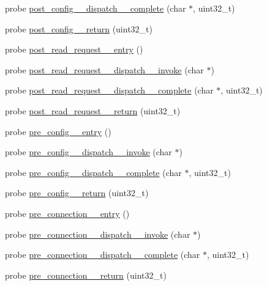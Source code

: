 \begin{DoxyCompactItemize}
\item 
probe \hyperlink{apache__probes_8d_af832d222f2f61698f1e702b78f2fcf2d}{post\+\_\+config\+\_\+\+\_\+dispatch\+\_\+\+\_\+complete} (char $\ast$, uint32\+\_\+t)
\item 
probe \hyperlink{apache__probes_8d_aa95af020f111d6cc355832a55fd1aa49}{post\+\_\+config\+\_\+\+\_\+return} (uint32\+\_\+t)
\item 
probe \hyperlink{apache__probes_8d_a6d6fbfb0f3cbb8d5c67000c1fe8adae6}{post\+\_\+read\+\_\+request\+\_\+\+\_\+entry} ()
\item 
probe \hyperlink{apache__probes_8d_a897acf51acacb7c23d288202390c0cea}{post\+\_\+read\+\_\+request\+\_\+\+\_\+dispatch\+\_\+\+\_\+invoke} (char $\ast$)
\item 
probe \hyperlink{apache__probes_8d_abb12cd51fe7db4166338960270edd34e}{post\+\_\+read\+\_\+request\+\_\+\+\_\+dispatch\+\_\+\+\_\+complete} (char $\ast$, uint32\+\_\+t)
\item 
probe \hyperlink{apache__probes_8d_a2752fc7ecb35e9642132e648b00982ea}{post\+\_\+read\+\_\+request\+\_\+\+\_\+return} (uint32\+\_\+t)
\item 
probe \hyperlink{apache__probes_8d_af39f9a628c5aa16f9fede53c2e575119}{pre\+\_\+config\+\_\+\+\_\+entry} ()
\item 
probe \hyperlink{apache__probes_8d_a28f99b954b3ad1265471251180197f87}{pre\+\_\+config\+\_\+\+\_\+dispatch\+\_\+\+\_\+invoke} (char $\ast$)
\item 
probe \hyperlink{apache__probes_8d_a518c5b90b3f27abedc5a6d8fe46620e8}{pre\+\_\+config\+\_\+\+\_\+dispatch\+\_\+\+\_\+complete} (char $\ast$, uint32\+\_\+t)
\item 
probe \hyperlink{apache__probes_8d_a7505694afed3fc516c0df8d0842ae144}{pre\+\_\+config\+\_\+\+\_\+return} (uint32\+\_\+t)
\item 
probe \hyperlink{apache__probes_8d_a1cb700cb4798f94b6ddcef42edf6143e}{pre\+\_\+connection\+\_\+\+\_\+entry} ()
\item 
probe \hyperlink{apache__probes_8d_adb56270d94345a9f90b004450338c8f7}{pre\+\_\+connection\+\_\+\+\_\+dispatch\+\_\+\+\_\+invoke} (char $\ast$)
\item 
probe \hyperlink{apache__probes_8d_a35241364308dcf1b7df95bfd734864c3}{pre\+\_\+connection\+\_\+\+\_\+dispatch\+\_\+\+\_\+complete} (char $\ast$, uint32\+\_\+t)
\item 
probe \hyperlink{apache__probes_8d_ada9f7172119f518b4418d0934449c8c1}{pre\+\_\+connection\+\_\+\+\_\+return} (uint32\+\_\+t)
\item 

\end{DoxyCompactItemize}
